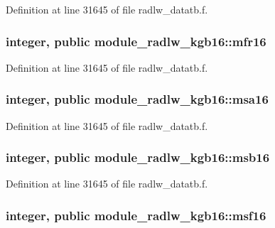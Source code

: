 Definition at line 31645 of file radlw\+\_\+datatb.\+f.

\subsubsection[{\texorpdfstring{mfr16}{mfr16}}]{\setlength{\rightskip}{0pt plus 5cm}integer, public module\+\_\+radlw\+\_\+kgb16\+::mfr16}\hypertarget{namespacemodule__radlw__kgb16_a82777667b951207c62955e3e1492d79d}{}\label{namespacemodule__radlw__kgb16_a82777667b951207c62955e3e1492d79d}


Definition at line 31645 of file radlw\+\_\+datatb.\+f.

\subsubsection[{\texorpdfstring{msa16}{msa16}}]{\setlength{\rightskip}{0pt plus 5cm}integer, public module\+\_\+radlw\+\_\+kgb16\+::msa16}\hypertarget{namespacemodule__radlw__kgb16_a95bf5395b579ca6619de3fc40c7ded79}{}\label{namespacemodule__radlw__kgb16_a95bf5395b579ca6619de3fc40c7ded79}


Definition at line 31645 of file radlw\+\_\+datatb.\+f.

\subsubsection[{\texorpdfstring{msb16}{msb16}}]{\setlength{\rightskip}{0pt plus 5cm}integer, public module\+\_\+radlw\+\_\+kgb16\+::msb16}\hypertarget{namespacemodule__radlw__kgb16_a18ad5b461d6c71b1aa2d82d5694beb03}{}\label{namespacemodule__radlw__kgb16_a18ad5b461d6c71b1aa2d82d5694beb03}


Definition at line 31645 of file radlw\+\_\+datatb.\+f.

\subsubsection[{\texorpdfstring{msf16}{msf16}}]{\setlength{\rightskip}{0pt plus 5cm}integer, public module\+\_\+radlw\+\_\+kgb16\+::msf16}\hypertarget{namespacemodule__radlw__kgb16_a8601911604c1d6a1b32e434159ae95d2}{}\label{namespacemodule__radlw__kgb16_a8601911604c1d6a1b32e434159ae95d2}


